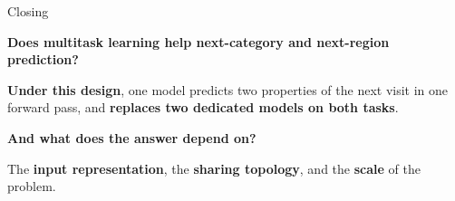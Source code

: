 \documentclass{beamer}
\begin{document}
{
\specialframe
\begin{frame}{Closing}
    \vfill
    \begin{center}
    \begin{minipage}{0.94\textwidth}
          \raggedright
        {\large\bfseries Does multitask learning help next-category and next-region prediction?}
        \par\medskip
        \hspace*{5mm}\begin{minipage}{0.92\textwidth}
            {\large \alert{\textbf{Under this design}}, one model predicts two properties of the
            next visit in one forward pass, and \textbf{replaces two dedicated models on both
            tasks}.\par}
        \end{minipage}

        \bigskip
        {\large\bfseries And what does the answer depend on?}
        \par\medskip
        \hspace*{5mm}\begin{minipage}{0.92\textwidth}
            {\large The \textbf{input representation}, the \textbf{sharing topology}, and the
            \textbf{scale} of the problem.\par}
        \end{minipage}

    \end{minipage}
    \end{center}
    \vfill
\end{frame}
}
\end{document}
